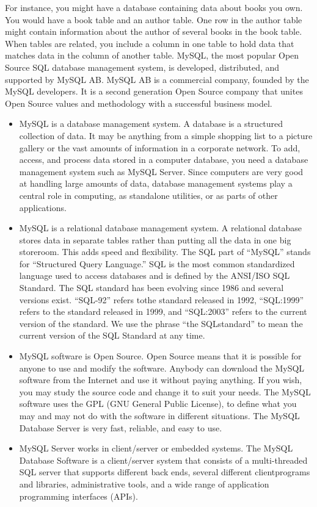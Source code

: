For instance, you might have a database containing data about books you own. You would have a book table and an author table. One row in the author table might contain information about the author of several books in the book table. When tables are related, you include a column in one table to hold data that matches data in the column of another table. MySQL, the most popular Open Source SQL database management system, is developed, distributed, and supported by MySQL AB. MySQL AB is a commercial company, founded by the MySQL developers. It is a second generation Open Source company that unites Open Source values and methodology with a successful business model.
\begin{itemize}
	\item MySQL is a database management system. A database is a structured collection of data. It may be anything from a simple shopping list to a picture gallery or the vast	amounts of information in a corporate network. To add, access, and process data stored in a computer database, you need a database management system such as	MySQL Server. Since computers are very good at handling large amounts of data,
	database management systems play a central role in computing, as standalone utilities, or as parts of other applications.
	
	\item MySQL is a relational database management system. A relational database stores data in separate tables rather than putting all the data in one big storeroom. This adds speed and flexibility. The SQL part of “MySQL” stands for “Structured Query Language.” SQL is the most common standardized language used to access databases and is defined by the ANSI/ISO SQL Standard. The SQL standard has been evolving since 1986 and several versions exist. “SQL-92” refers tothe standard released in	1992, “SQL:1999” refers to the standard released in 1999, and “SQL:2003” refers to the current version of the standard. We use the phrase “the SQLstandard” to mean the current version of the SQL Standard at any time.
	
	\item MySQL software is Open Source. Open Source means that it is possible for anyone to use and modify the software. Anybody can download the MySQL software from the Internet and use it without paying anything. If you wish, you may study the source code and change it to suit your needs. The MySQL software uses the GPL (GNU General Public License), to define what you may and may not do with the software in
	different situations. The MySQL Database Server is very fast, reliable, and easy to use.
	
	\item MySQL Server works in client/server or embedded systems. The MySQL Database Software is a client/server system that consists of a multi-threaded SQL server that supports different back ends, several different clientprograms and libraries, administrative tools, and a wide range of application programming interfaces (APIs).
	\end{itemize}

\thispagestyle{fancy}
